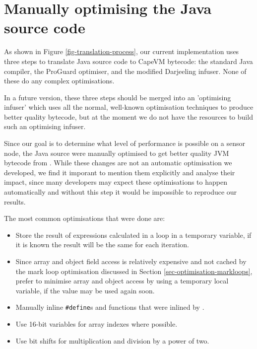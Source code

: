\section{Manually optimising the Java source code}
\label{sec-optimisations-manual-java-source-optimisation}
As shown in Figure \ref{fig-translation-process}, our current implementation uses three steps to translate Java source code to CapeVM bytecode: the standard Java compiler, the ProGuard optimiser, and the modified Darjeeling infuser. None of these do any complex optimisations. 

In a future version, these three steps should be merged into an 'optimising infuser' which uses all the normal, well-known optimisation techniques to produce better quality bytecode, but at the moment we do not have the resources to build such an optimising infuser.

Since our goal is to determine what level of performance is possible on a sensor node, the Java source were manually optimised to get better quality JVM bytecode from . While these changes are not an automatic optimisation we developed, we find it imporant to mention them explicitly and analyse their impact, since many developers may expect these optimisations to happen automatically and without this step it would be impossible to reproduce our results.


The most common optimisations that were done are:
\begin{itemize}
	\item Store the result of expressions calculated in a loop in a temporary variable, if it is known the result will be the same for each iteration.
	\item Since array and object field access is relatively expensive and not cached by the mark loop optimisation discussed in Section \ref{sec-optimisation-markloops}, prefer to minimise array and object access by using a temporary local variable, if the value may be used again soon.
	\item Manually inline \texttt{\#define}s and functions that were inlined by .
	\item Use 16-bit variables for array indexes where possible.
	\item Use bit shifts for multiplication and division by a power of two.
\end{itemize}

